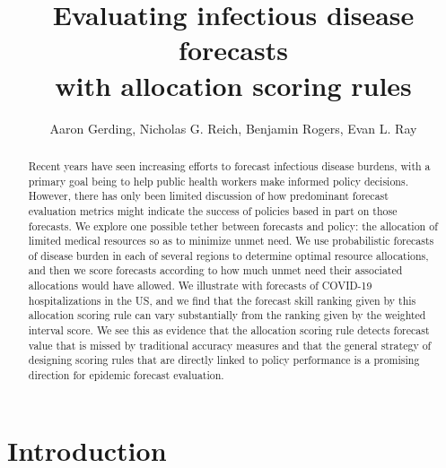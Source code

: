 \documentclass{article}\usepackage[]{graphicx}\usepackage[]{xcolor}
\title{Evaluating infectious disease forecasts \\ with allocation scoring rules}
\author{Aaron Gerding, Nicholas G. Reich, Benjamin Rogers, Evan L. Ray}
\begin{document}
\newcommand{\del}[2]{\frac{\partial {#1} }{\partial {#2}} }
\newcommand{\dby}[2]{\frac{d {#1} }{d {#2}} }
\newcommand{\sbar}{\overline{s}}
\newtheorem{proposition}{Proposition}

\theoremstyle{remark}
\newtheorem*{remark}{Remark}

\maketitle







\begin{abstract}

Recent years have seen increasing efforts to forecast infectious disease burdens, with a primary goal being to help
public health workers make informed policy decisions. However, there has only been limited discussion of how
predominant forecast evaluation metrics might indicate the success of policies based in part on those forecasts. We
explore one possible tether between forecasts and policy: the allocation of limited medical resources so as to minimize
unmet need. We use probabilistic forecasts of disease burden in each of several regions to determine optimal resource
allocations, and then we score forecasts according to how much unmet need their associated allocations would have
allowed. We illustrate with forecasts of COVID-19 hospitalizations in the US, and we find that the forecast skill
ranking given by this allocation scoring rule can vary substantially from the ranking given by the weighted interval
score. We see this as evidence that the allocation scoring rule detects forecast value that is missed by traditional
accuracy measures and that the general strategy of designing scoring rules that are directly linked to policy
performance is a promising direction for epidemic forecast evaluation.

\end{abstract}

\section{Introduction}
\end{document}
